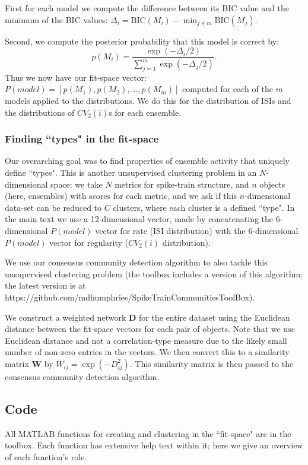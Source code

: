 \documentclass[11pt,a4paper]{article}
\begin{document}
First for each model we compute the difference between its BIC value and the minimum of the BIC values:
$\Delta_i = \mathrm{BIC}(M_i) - \min_{j \in m} \mathrm{BIC}(M_j)$.

Second, we compute the posterior probability that this model is correct by:
\begin{equation}
p(M_i) =  \frac{\exp(-\Delta_i/2)}{\sum_{j=1}^{m}\exp(-\Delta_j/2)}.	
\end{equation}
Thus we now have our fit-space vector: $P(model) = [p(M_1), p(M_2),...,p(M_m)]$ computed for each of the $m$ models applied to the distributions. We do this for the distribution of ISIs and the distributions of $CV_2(i)$s for each ensemble.


\subsubsection{Finding ``types" in the fit-space}
Our overarching goal was to find properties of ensemble activity that uniquely define ``types". This is another unsupervised clustering problem in an $N$-dimensional space: we take $N$ metrics for spike-train structure, and $n$ objects (here, ensembles) with scores for each metric, and we ask if this $n$-dimensional data-set can be reduced to $C$ clusters, where each cluster is a defined ``type". In the main text we use a 12-dimensional vector, made by concatenating the 6-dimensional $P(model)$ vector for rate (ISI distribution) with the 6-dimensional $P(model)$ vector for regularity ($CV_2(i)$ distribution).

We use our consensus community detection algorithm to also tackle this unsupervised clustering problem (the toolbox includes a version of this algorithm; the latest version is at https://github.com/mdhumphries/SpikeTrainCommunitiesToolBox). 

We construct a weighted network $\mathbf{D}$ for the entire dataset using the Euclidean distance between the fit-space vectors for each pair of objects. Note that we use Euclidean distance and not a correlation-type measure due to the likely small number of non-zero entries in the vectors. We then convert this to a similarity matrix $\mathbf{W}$ by $W_{ij} = \exp(-D_{ij}^2)$. This similarity matrix is then passed to the consensus community detection algorithm.



\subsection{Code}
All MATLAB functions for creating and clustering in the ``fit-space" are in the toolbox. Each function has extensive help text within it; here we give an overview of each function's role.
\end{document}
